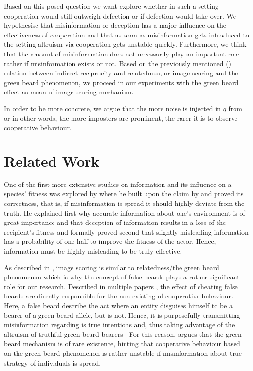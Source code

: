 \documentclass[sigconf]{acmart}
\begin{document}
    Based on this posed question we want explore whether in such a setting cooperation would still outweigh defection or if defection would take over.
    We hypothesise that misinformation or deception has a major influence on the effectiveness of cooperation and that as soon as misinformation gets introduced to the setting altruism via cooperation gets unstable quickly.
    Furthermore, we think that the amount of misinformation does not necessarily play an important role rather if misinformation exists or not.
    Based on the previously mentioned () relation between indirect reciprocity and relatedness, or image scoring and the green beard phenomenon, we proceed in our experiments with the green beard effect as mean of image scoring mechanism.

    In order to be more concrete, we argue that the more noise is injected in $q$ from  or in other words, the more imposters are prominent, the rarer it is to observe cooperative behaviour.


    \section{Related Work}
    One of the first more extensive studies on information and its influence on a species' fitness was explored by \citeauthor{wallace_misinformation_1973} \cite{wallace_misinformation_1973} where he built upon the claim by \citeauthor{fisherGeneticalTheoryNatural1930} \cite{fisherGeneticalTheoryNatural1930} and proved its correctness, that is, if misinformation is spread it should highly deviate from the truth.
    He explained first why accurate information about one's environment is of great importance and that deception of information results in a loss of the recipient's fitness and formally proved second that slightly misleading information has a probability of one half to improve the fitness of the actor.
    Hence, information must be highly misleading to be truly effective.

    As described in , image scoring is similar to relatedness/the green beard phenomenon which is why the concept of false beards plays a rather significant role for our research.
    Described in multiple papers \cite{SelfishGeneRichard,roberts_kin_2019,west_altruism_2010}, the effect of cheating false beards are directly responsible for the non-existing of cooperative behaviour.
    Here, a false beard describe the act where an entity disguises himself to be a bearer of a green beard allele, but is not.
    Hence, it is purposefully transmitting misinformation regarding is true intentions and, thus taking advantage of the altruism of truthful green beard bearers \cite{SelfishGeneRichard}.
    For this reason, \citeauthor{SelfishGeneRichard} \cite{SelfishGeneRichard} argues that the green beard mechanism is of rare existence, hinting that cooperative behaviour based on the green beard phenomenon is rather unstable if misinformation about true strategy of individuals is spread.
\end{document}
